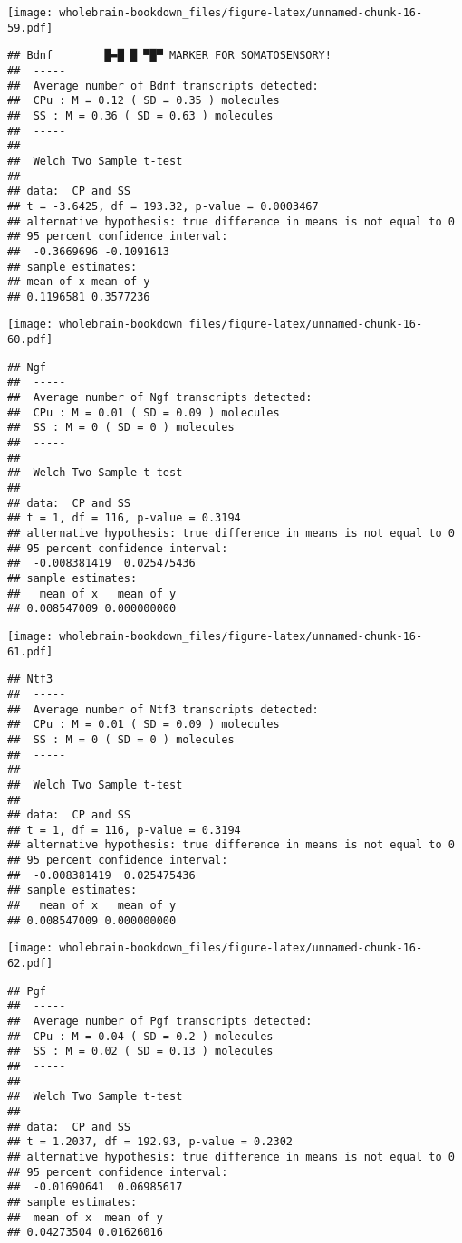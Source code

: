 \documentclass[]{book}
\theoremstyle{definition}
\theoremstyle{definition}
\theoremstyle{remark}
\begin{document}
\texttt{[image: wholebrain-bookdown\_files/figure-latex/unnamed-chunk-16-59.pdf]}

\begin{verbatim}
## Bdnf        █▬█ █ ▀█▀ MARKER FOR SOMATOSENSORY!
##  -----
##  Average number of Bdnf transcripts detected:
##  CPu : M = 0.12 ( SD = 0.35 ) molecules 
##  SS : M = 0.36 ( SD = 0.63 ) molecules
##  -----
## 
##  Welch Two Sample t-test
## 
## data:  CP and SS
## t = -3.6425, df = 193.32, p-value = 0.0003467
## alternative hypothesis: true difference in means is not equal to 0
## 95 percent confidence interval:
##  -0.3669696 -0.1091613
## sample estimates:
## mean of x mean of y 
## 0.1196581 0.3577236
\end{verbatim}

\texttt{[image: wholebrain-bookdown\_files/figure-latex/unnamed-chunk-16-60.pdf]}

\begin{verbatim}
## Ngf
##  -----
##  Average number of Ngf transcripts detected:
##  CPu : M = 0.01 ( SD = 0.09 ) molecules 
##  SS : M = 0 ( SD = 0 ) molecules
##  -----
## 
##  Welch Two Sample t-test
## 
## data:  CP and SS
## t = 1, df = 116, p-value = 0.3194
## alternative hypothesis: true difference in means is not equal to 0
## 95 percent confidence interval:
##  -0.008381419  0.025475436
## sample estimates:
##   mean of x   mean of y 
## 0.008547009 0.000000000
\end{verbatim}

\texttt{[image: wholebrain-bookdown\_files/figure-latex/unnamed-chunk-16-61.pdf]}

\begin{verbatim}
## Ntf3
##  -----
##  Average number of Ntf3 transcripts detected:
##  CPu : M = 0.01 ( SD = 0.09 ) molecules 
##  SS : M = 0 ( SD = 0 ) molecules
##  -----
## 
##  Welch Two Sample t-test
## 
## data:  CP and SS
## t = 1, df = 116, p-value = 0.3194
## alternative hypothesis: true difference in means is not equal to 0
## 95 percent confidence interval:
##  -0.008381419  0.025475436
## sample estimates:
##   mean of x   mean of y 
## 0.008547009 0.000000000
\end{verbatim}

\texttt{[image: wholebrain-bookdown\_files/figure-latex/unnamed-chunk-16-62.pdf]}

\begin{verbatim}
## Pgf
##  -----
##  Average number of Pgf transcripts detected:
##  CPu : M = 0.04 ( SD = 0.2 ) molecules 
##  SS : M = 0.02 ( SD = 0.13 ) molecules
##  -----
## 
##  Welch Two Sample t-test
## 
## data:  CP and SS
## t = 1.2037, df = 192.93, p-value = 0.2302
## alternative hypothesis: true difference in means is not equal to 0
## 95 percent confidence interval:
##  -0.01690641  0.06985617
## sample estimates:
##  mean of x  mean of y 
## 0.04273504 0.01626016
\end{verbatim}
\end{document}
